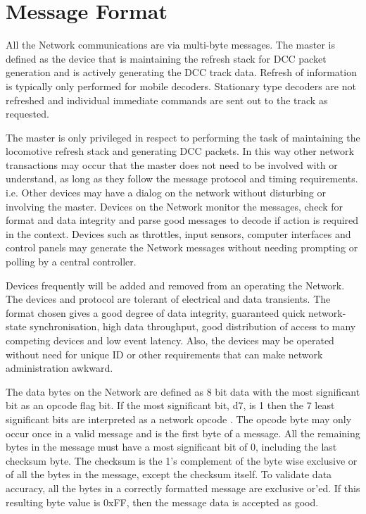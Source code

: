 \section{Message Format}

All the Network communications are via multi-byte messages. The master is defined as the device that is maintaining the refresh stack for DCC packet generation and is actively generating the DCC track data. Refresh of information is typically only performed for mobile decoders. Stationary type decoders are not refreshed and individual immediate commands are sent out to the track as requested.

The master is only privileged in respect to performing the task of maintaining the locomotive refresh stack and generating DCC packets. In this way other network transactions may occur that the master does not need to be involved with or understand, as long as they follow the message protocol and timing requirements. i.e. Other devices may have a dialog on the network without disturbing or involving the master. Devices on the Network monitor the messages, check for format and data integrity and parse good messages to decode if action is required in the context. Devices such as throttles, input sensors, computer interfaces and control panels may generate the Network messages without needing prompting or polling by a central controller.

Devices frequently will be added and removed from an operating the Network. The devices and protocol are tolerant of electrical and data transients. The format chosen gives a good degree of data integrity, guaranteed quick network-state synchronisation, high data throughput, good distribution of access to many competing devices and low event latency. Also, the devices may be operated without need for unique ID or other requirements that can make network administration awkward.

The data bytes on the Network are defined as 8 bit data with the most significant bit as an opcode flag bit. If the most significant bit, d7, is 1 then the 7 least significant bits are interpreted as a network opcode . The opcode byte may only occur once in a valid message and is the first byte of a message. All the remaining bytes in the message must have a most significant bit of 0, including the last checksum byte. The checksum is the 1's complement of the byte wise exclusive or of all the bytes in the message, except the checksum itself. To validate data accuracy, all the bytes in a correctly formatted message are exclusive or'ed. If this resulting byte value is 0xFF, then the message data is accepted as good.

